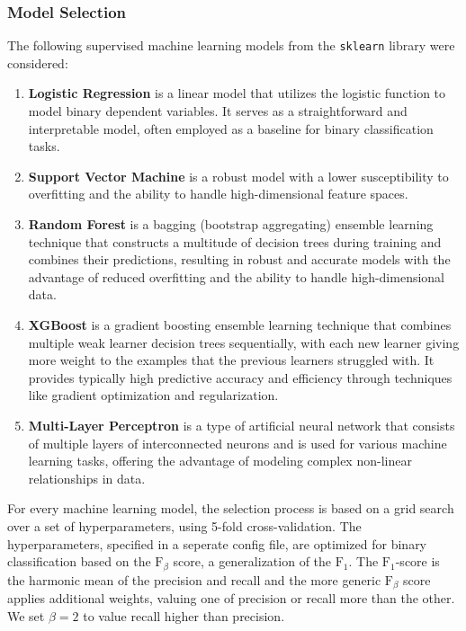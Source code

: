 \subsubsection{Model Selection}
The following supervised machine learning models from the \texttt{sklearn} library were considered: 
\begin{enumerate}
    \item \textbf{Logistic Regression} is a linear model that utilizes the logistic function to model binary dependent variables. It serves as a straightforward and interpretable model, often employed as a baseline for binary classification tasks.
    \item \textbf{Support Vector Machine} is a robust model with a lower susceptibility to overfitting and the ability to handle high-dimensional feature spaces.
    \item \textbf{Random Forest} is a bagging (bootstrap aggregating) ensemble learning technique that constructs a multitude of decision trees during training and combines their predictions, resulting in robust and accurate models with the advantage of reduced overfitting and the ability to handle high-dimensional data.
    \item \textbf{XGBoost} is a gradient boosting ensemble learning technique that combines multiple weak learner decision trees sequentially, with each new learner giving more weight to the examples that the previous learners struggled with. It provides typically high predictive accuracy and efficiency through techniques like gradient optimization and regularization.
    \item \textbf{Multi-Layer Perceptron} is a type of artificial neural network that consists of multiple layers of interconnected neurons and is used for various machine learning tasks, offering the advantage of modeling complex non-linear relationships in data.
\end{enumerate}

For every machine learning model, the selection process is based on a grid search over a set of hyperparameters, using 5-fold cross-validation. The hyperparameters, specified in a seperate config file, are optimized for binary classification based on the $\text{F}_{\beta}$ score, a generalization of the $\text{F}_{1}$. The $\text{F}_{1}$-score is the harmonic mean of the precision and recall and the more generic $\text{F}_{\beta}$ score applies additional weights, valuing one of precision or recall more than the other. We set $\beta=2$ to value recall higher than precision. 


